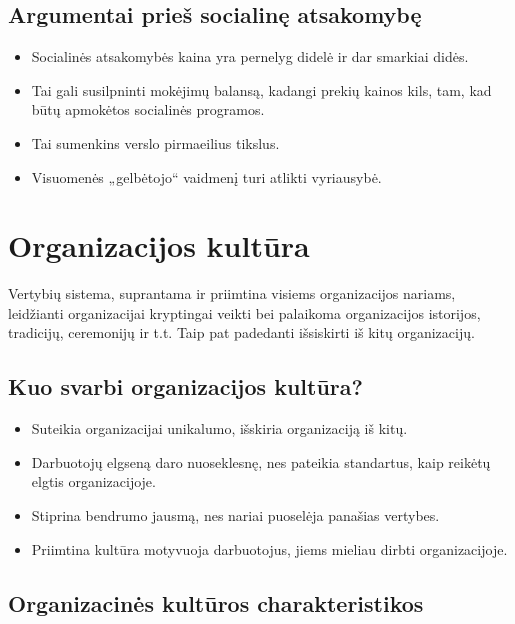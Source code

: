 \section{Argumentai prieš socialinę atsakomybę}

\begin{itemize}
  \item Socialinės atsakomybės kaina yra pernelyg didelė ir dar smarkiai
    didės.
  \item Tai gali susilpninti mokėjimų balansą, kadangi prekių kainos kils,
    tam, kad būtų apmokėtos socialinės programos.
  \item Tai sumenkins verslo pirmaeilius tikslus.
  \item Visuomenės „gelbėtojo“ vaidmenį turi atlikti vyriausybė.
\end{itemize}

\chapter{Organizacijos kultūra}

\begin{defn}
  Vertybių sistema, suprantama ir priimtina visiems organizacijos
  nariams, leidžianti organizacijai kryptingai veikti bei palaikoma
  organizacijos istorijos, tradicijų, ceremonijų ir t.t. Taip pat
  padedanti išsiskirti iš kitų organizacijų.
\end{defn}

\section{Kuo svarbi organizacijos kultūra?}

\begin{itemize}
  \item Suteikia organizacijai unikalumo, išskiria organizaciją iš kitų.
  \item Darbuotojų elgseną daro nuoseklesnę, nes pateikia standartus,
    kaip reikėtų elgtis organizacijoje.
  \item Stiprina bendrumo jausmą, nes nariai puoselėja panašias vertybes.
  \item Priimtina kultūra motyvuoja darbuotojus, jiems mieliau dirbti
    organizacijoje.
\end{itemize}

\section{Organizacinės kultūros charakteristikos}

